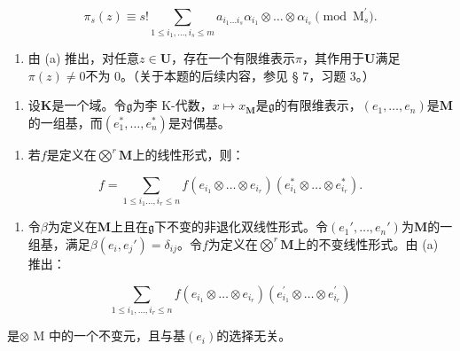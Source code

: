 \[
\pi_ {s} (z) \equiv s! \sum_ {1 \leqslant i _ {1}, \dots , i _ {s} \leqslant m} a _ {i _ {1} \dots i _ {s}} \alpha_ {i _ {1}} \otimes \dots \otimes \alpha_ {i _ {s}} \pmod {\mathrm{M} _ {s} ^ {\prime}}.
\]

\begin{enumerate}
\def\labelenumi{(\alph{enumi})}
\setcounter{enumi}{1}
\tightlist
\item
  由 (a) 推出，对任意\(z \in \mathbf{U}\)，存在一个有限维表示\(\pi\)，其作用于\(\mathbf{U}\)满足\(\pi(z) \neq 0\)不为 0。（关于本题的后续内容，参见 § 7，习题 3。）
\end{enumerate}

\begin{enumerate}
\def\labelenumi{\arabic{enumi}.}
\setcounter{enumi}{5}
\tightlist
\item
 设\(\mathbf{K}\)是一个域。令\(\mathfrak{g}\)为李 K-代数，\(x \mapsto x_{\mathbf{M}}\)是\(\mathfrak{g}\)的有限维表示，\((e_1, \ldots, e_n)\)是\(\mathbf{M}\)的一组基，而\((e_1^*, \ldots, e_n^*)\)是对偶基。
\end{enumerate}

\begin{enumerate}
\def\labelenumi{(\alph{enumi})}
\tightlist
\item
  若\(f\)是定义在\(\bigotimes^{r} \mathbf{M}\)上的线性形式，则：
\end{enumerate}

\[
f = \sum_ {1 \leqslant i _ {1} \dots , i _ {r} \leqslant n} f (e _ {i _ {1}} \otimes \dots \otimes e _ {i _ {r}}) (e _ {i _ {1}} ^ {*} \otimes \dots \otimes e _ {i _ {r}} ^ {*}).
\]

\begin{enumerate}
\def\labelenumi{(\alph{enumi})}
\setcounter{enumi}{1}
\tightlist
\item
  令\(\beta\)为定义在\(\mathbf{M}\)上且在\(\mathfrak{g}\)下不变的非退化双线性形式。令\((e_1', \ldots, e_n')\)为\(\mathbf{M}\)的一组基，满足\(\beta(e_i, e_j') = \delta_{ij}\)。令\(f\)为定义在\(\bigotimes^r \mathbf{M}\)上的不变线性形式。由 (a) 推出：
\end{enumerate}

\[
\sum_ {1 \leqslant i _ {1}, \dots , i _ {r} \leqslant n} f (e _ {i _ {1}} \otimes \dots \otimes e _ {i _ {r}}) (e _ {i _ {1}} ^ {\prime} \otimes \dots \otimes e _ {i _ {r}} ^ {\prime})
\]

是\(\otimes\) M 中的一个不变元，且与基\((e_i)\)的选择无关。

